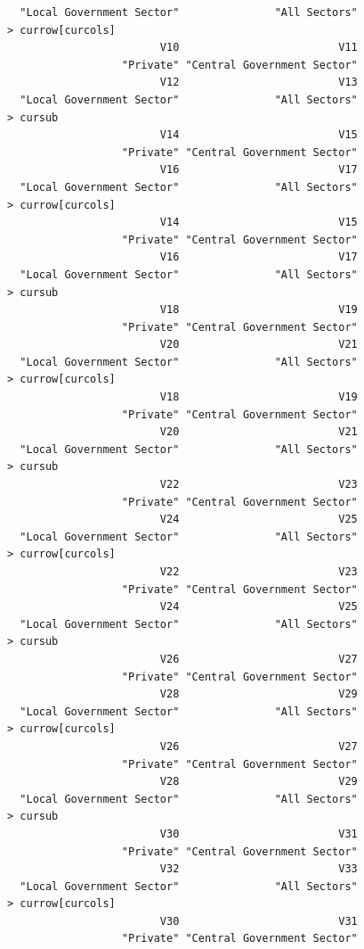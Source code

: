 \documentclass[a4paper]{article}
\begin{document}
\begin{verbatim}
  "Local Government Sector"               "All Sectors" 
> currow[curcols] 
                        V10                         V11 
                  "Private" "Central Government Sector" 
                        V12                         V13 
  "Local Government Sector"               "All Sectors" 
> cursub 
                        V14                         V15 
                  "Private" "Central Government Sector" 
                        V16                         V17 
  "Local Government Sector"               "All Sectors" 
> currow[curcols] 
                        V14                         V15 
                  "Private" "Central Government Sector" 
                        V16                         V17 
  "Local Government Sector"               "All Sectors" 
> cursub 
                        V18                         V19 
                  "Private" "Central Government Sector" 
                        V20                         V21 
  "Local Government Sector"               "All Sectors" 
> currow[curcols] 
                        V18                         V19 
                  "Private" "Central Government Sector" 
                        V20                         V21 
  "Local Government Sector"               "All Sectors" 
> cursub 
                        V22                         V23 
                  "Private" "Central Government Sector" 
                        V24                         V25 
  "Local Government Sector"               "All Sectors" 
> currow[curcols] 
                        V22                         V23 
                  "Private" "Central Government Sector" 
                        V24                         V25 
  "Local Government Sector"               "All Sectors" 
> cursub 
                        V26                         V27 
                  "Private" "Central Government Sector" 
                        V28                         V29 
  "Local Government Sector"               "All Sectors" 
> currow[curcols] 
                        V26                         V27 
                  "Private" "Central Government Sector" 
                        V28                         V29 
  "Local Government Sector"               "All Sectors" 
> cursub 
                        V30                         V31 
                  "Private" "Central Government Sector" 
                        V32                         V33 
  "Local Government Sector"               "All Sectors" 
> currow[curcols] 
                        V30                         V31 
                  "Private" "Central Government Sector" 

\end{verbatim}
\end{document}
